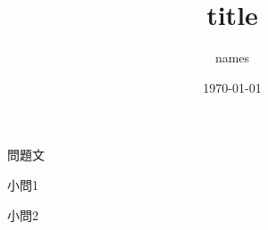 \documentclass[11pt]{ltjsarticle}
\title{title}
\author{names}
\date{\today}
\begin{document}
\maketitle

\section{}

問題文

\begin{subproblems}
\item 小問1
\item 小問2
\end{subproblems}


\end{document}
